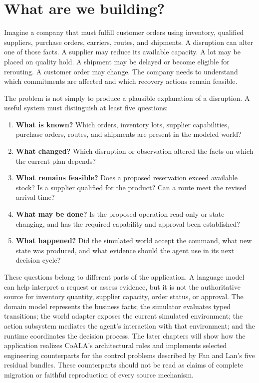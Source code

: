 \section{What are we building?}
\label{sec:ch19-what-we-build}

Imagine a company that must fulfill customer orders using inventory, qualified suppliers, purchase orders, carriers, routes, and shipments. A disruption can alter one of those facts. A supplier may reduce its available capacity. A lot may be placed on quality hold. A shipment may be delayed or become eligible for rerouting. A customer order may change. The company needs to understand which commitments are affected and which recovery actions remain feasible.

The problem is not simply to produce a plausible explanation of a disruption. A useful system must distinguish at least five questions:

\begin{enumerate}
  \item \textbf{What is known?} Which orders, inventory lots, supplier capabilities, purchase orders, routes, and shipments are present in the modeled world?
  \item \textbf{What changed?} Which disruption or observation altered the facts on which the current plan depends?
  \item \textbf{What remains feasible?} Does a proposed reservation exceed available stock? Is a supplier qualified for the product? Can a route meet the revised arrival time?
  \item \textbf{What may be done?} Is the proposed operation read-only or state-changing, and has the required capability and approval been established?
  \item \textbf{What happened?} Did the simulated world accept the command, what new state was produced, and what evidence should the agent use in its next decision cycle?
\end{enumerate}

These questions belong to different parts of the application. A language model can help interpret a request or assess evidence, but it is not the authoritative source for inventory quantity, supplier capacity, order status, or approval. The domain model represents the business facts; the simulator evaluates typed transitions; the world adapter exposes the current simulated environment; the action subsystem mediates the agent's interaction with that environment; and the runtime coordinates the decision process. The later chapters will show how the application realizes CoALA's architectural roles and implements selected engineering counterparts for the control problems described by Fan and Lan's five residual bundles. These counterparts should not be read as claims of complete migration or faithful reproduction of every source mechanism.

